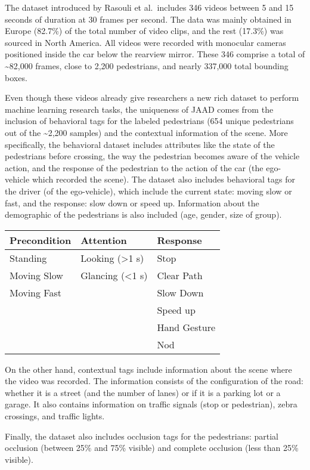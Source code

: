 \documentclass[
]{article}
\begin{document}
The dataset introduced by Rasouli et al.~includes 346 videos between 5
and 15 seconds of duration at 30 frames per second. The data was mainly
obtained in Europe (82.7\%) of the total number of video clips, and the
rest (17.3\%) was sourced in North America. All videos were recorded
with monocular cameras positioned inside the car below the rearview
mirror. These 346 comprise a total of \textasciitilde82,000 frames,
close to 2,200 pedestrians, and nearly 337,000 total bounding boxes.

Even though these videos already give researchers a new rich dataset to
perform machine learning research tasks, the uniqueness of JAAD comes
from the inclusion of behavioral tags for the labeled pedestrians (654
unique pedestrians out of the \textasciitilde2,200 samples) and the
contextual information of the scene. More specifically, the behavioral
dataset includes attributes like the state of the pedestrians before
crossing, the way the pedestrian becomes aware of the vehicle action,
and the response of the pedestrian to the action of the car (the
ego-vehicle which recorded the scene). The dataset also includes
behavioral tags for the driver (of the ego-vehicle), which include the
current state: moving slow or fast, and the response: slow down or speed
up. Information about the demographic of the pedestrians is also
included (age, gender, size of group).

\begin{longtable}[]{@{}lll@{}}
\toprule
Precondition & Attention & Response \\
\midrule
\endhead
Standing & Looking (\textgreater1 s) & Stop \\
Moving Slow & Glancing (\textless1 s) & Clear Path \\
Moving Fast & & Slow Down \\
& & Speed up \\
& & Hand Gesture \\
& & Nod \\
\bottomrule
\end{longtable}

On the other hand, contextual tags include information about the scene
where the video was recorded. The information consists of the
configuration of the road: whether it is a street (and the number of
lanes) or if it is a parking lot or a garage. It also contains
information on traffic signals (stop or pedestrian), zebra crossings,
and traffic lights.

Finally, the dataset also includes occlusion tags for the pedestrians:
partial occlusion (between 25\% and 75\% visible) and complete occlusion
(less than 25\% visible).
\end{document}
